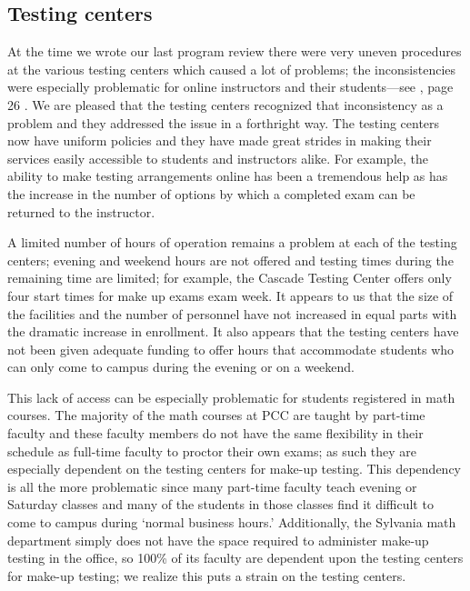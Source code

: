 \subsection{Testing centers}
At the time we wrote our last program review there were very uneven procedures
at the various testing centers which caused a lot of problems; the
inconsistencies were especially problematic for online instructors and their
students---see \cite{mathprogramreview2003}, page 26 .  We are pleased that the testing centers recognized that
inconsistency as a problem and they addressed the issue in a forthright way.
The testing centers now have uniform policies and they have made great strides
in making their services easily accessible to students and instructors alike.
For example, the ability to make testing arrangements online has been a
tremendous help as has the increase in the number of options by which a
completed exam can be returned to the instructor.

A limited number of hours of operation remains a problem at each of the testing
centers;   evening and weekend hours are not offered and testing times during
the remaining time are limited; for example, the Cascade Testing Center
offers only four start times for make up exams exam week.  It appears to us that the size of  the
facilities and the number of personnel  have not increased in equal parts with
the dramatic increase in enrollment.   It also appears that the testing centers
have not been given adequate funding to offer hours that accommodate students
who can only come to campus during the evening or on a weekend.

This lack of access can be especially problematic for students registered in
math courses.  The majority of the math courses at PCC are taught by part-time
faculty and these faculty members do not have the same flexibility in their
schedule as full-time faculty to proctor their own exams; as such they are
especially dependent on the testing centers for make-up testing. This
dependency is all the more problematic since many part-time faculty teach
evening or Saturday classes and many of the students in those classes find it
difficult to come to campus during `normal business hours.' Additionally, the
Sylvania math department simply does not have the space required to
administer make-up testing in the office, so 100\% of its faculty are dependent
upon the testing centers for make-up testing;   we realize this puts a strain
on the testing centers.


